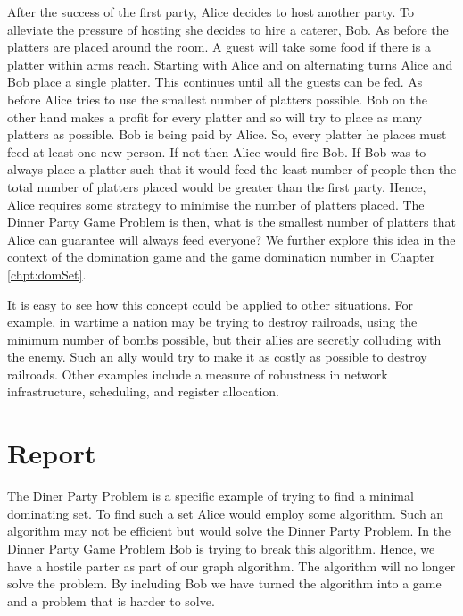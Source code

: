 After the success of the first party, Alice decides to host another party. To alleviate the pressure of hosting she decides to hire a caterer, Bob. As before the platters are placed around the room. A guest will take some food if there is a platter within arms reach. Starting with Alice and on alternating turns Alice and Bob place a single platter. This continues until all the guests can be fed. As before Alice tries to use the smallest number of platters possible. Bob on the other hand makes a profit for every platter and so will try to place as many platters as possible. Bob is being paid by Alice. So, every platter he places must feed at least one new person. If not then Alice would fire Bob. If Bob was to always place a platter such that it would feed the least number of people then the total number of platters placed would be greater than the first party. Hence, Alice requires some strategy to minimise the number of platters placed. The Dinner Party Game Problem is then, what is the smallest number of platters that Alice can guarantee will always feed everyone? 
We further explore this idea in the context of the domination game and the game domination number in Chapter \ref{chpt:domSet}.

It is easy to see how this concept could be applied to other situations. For example, in wartime a nation may be trying to destroy railroads, using the minimum number of bombs possible, but their allies are secretly colluding with the enemy. Such an ally would try to make it as costly as possible to destroy railroads. Other examples include a measure of robustness in network infrastructure, scheduling, and register allocation.  

\section{Report}

The Diner Party Problem is a specific example of trying to find a minimal dominating set. To find such a set Alice would employ some algorithm. Such an algorithm may not be efficient but would solve the Dinner Party Problem. In the Dinner Party Game Problem Bob is trying to break this algorithm. Hence, we have a hostile parter as part of our graph algorithm. The algorithm will no longer solve the problem. By including Bob we have turned the algorithm into a game and a problem that is harder to solve. 

